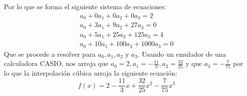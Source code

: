 \documentclass[letterpaper, 12pt]{article}
\begin{document}
Por lo que se forma el siguiente sistema de ecuaciones:
{\large\begin{equation*}
    \begin{aligned}
        a_0+0a_1+0a_2+0a_3=2\\
        a_0+3a_1+9a_2+27a_3=0\\
        a_0+5a_1+25a_2+125a_3=4\\
        a_0+10a_1+100a_2+1000a_3=0
    \end{aligned}
\end{equation*}}
\justify
Que se procede a resolver para \(a_0,a_1,a_2\) y \(a_3\). Usando un emulador de una calculadora CASIO, nos arroja que
\(a_0=2,a_1=-\frac{11}{3},a_2=\frac{32}{25}\) y que \(a_3=-\frac{7}{75}\) por lo que la interpolación cúbica arroja la siguiente ecuación:
{\large\[f(x)=2-\frac{11}{3}x+\frac{32}{25}x^2-\frac{7}{75}x^3\]}
\end{document}
